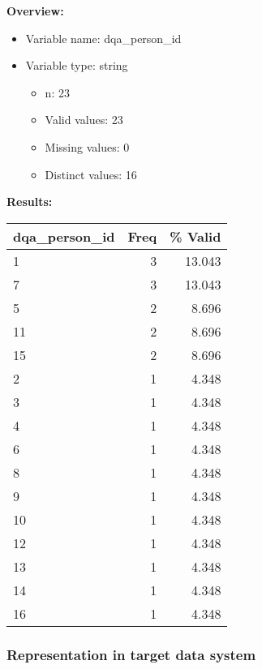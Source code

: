 \documentclass[
]{article}
\providecommand{\tightlist}{%
  \setlength{\itemsep}{0pt}\setlength{\parskip}{0pt}}
\begin{document}
\textbf{Overview:}

\begin{itemize}
\tightlist
\item
  Variable name: dqa\_person\_id
\item
  Variable type: string

  \begin{itemize}
  \tightlist
  \item
    n: 23
  \item
    Valid values: 23
  \item
    Missing values: 0
  \item
    Distinct values: 16
  \end{itemize}
\end{itemize}

\textbf{Results:}\\

\begin{table}[H]
\centering
\begin{tabular}{l|r|r}
\hline
\textbf{dqa\_person\_id} & \textbf{Freq} & \textbf{\% Valid}\\
\hline
1 & 3 & 13.043\\
\hline
7 & 3 & 13.043\\
\hline
5 & 2 & 8.696\\
\hline
11 & 2 & 8.696\\
\hline
15 & 2 & 8.696\\
\hline
2 & 1 & 4.348\\
\hline
3 & 1 & 4.348\\
\hline
4 & 1 & 4.348\\
\hline
6 & 1 & 4.348\\
\hline
8 & 1 & 4.348\\
\hline
9 & 1 & 4.348\\
\hline
10 & 1 & 4.348\\
\hline
12 & 1 & 4.348\\
\hline
13 & 1 & 4.348\\
\hline
14 & 1 & 4.348\\
\hline
16 & 1 & 4.348\\
\hline
\end{tabular}
\end{table}
\newpage

\hypertarget{representation-in-target-data-system-10}{%
\subsubsection{\texorpdfstring{Representation in \textbf{target} data
system}{Representation in target data system}}\label{representation-in-target-data-system-10}}
\end{document}
